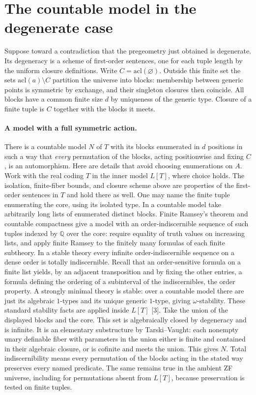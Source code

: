 \documentclass[11pt]{article}
\begin{document}
\section{The countable model in the degenerate case}
Suppose toward a contradiction that the pregeometry just obtained is degenerate. Its degeneracy is a scheme of first-order sentences, one for each tuple length by the uniform closure definitions. Write $C=\mathrm{acl}(\varnothing)$. Outside this finite set the sets $\mathrm{acl}(a)\setminus C$ partition the universe into blocks: membership between generic points is symmetric by exchange, and their singleton closures then coincide. All blocks have a common finite size $d$ by uniqueness of the generic type. Closure of a finite tuple is $C$ together with the blocks it meets.
\paragraph{A model with a full symmetric action.} There is a countable model $N$ of $T$ with its blocks enumerated in $d$ positions in such a way that \emph{every} permutation of the blocks, acting positionwise and fixing $C$, is an automorphism. Here are details that avoid choosing enumerations on $A$. Work with the real coding $T$ in the inner model $L[T]$, where choice holds. The isolation, finite-fiber bounds, and closure scheme above are properties of the first-order sentences in $T$ and hold there as well. One may name the finite tuple enumerating the core, using its isolated type. In a countable model take arbitrarily long lists of enumerated distinct blocks. Finite Ramsey's theorem and countable compactness give a model with an order-indiscernible sequence of such tuples indexed by $\mathbb Q$ over the core: require equality of truth values on increasing lists, and apply finite Ramsey to the finitely many formulas of each finite subtheory. In a stable theory every infinite order-indiscernible sequence on a dense order is totally indiscernible. Recall that an order-sensitive formula on a finite list yields, by an adjacent transposition and by fixing the other entries, a formula defining the ordering of a subinterval of the indiscernibles, the order property. A strongly minimal theory is stable: over a countable model there are just its algebraic $1$-types and its unique generic $1$-type, giving $\omega$-stability. These standard stability facts are applied inside $L[T]$ [3].
Take the union of the displayed blocks and the core. This set is algebraically closed by degeneracy and is infinite. It is an elementary substructure by Tarski--Vaught: each nonempty unary definable fiber with parameters in the union either is finite and contained in their algebraic closure, or is cofinite and meets the union. This gives $N$. Total indiscernibility means every permutation of the blocks acting in the stated way preserves every named predicate. The same remains true in the ambient ZF universe, including for permutations absent from $L[T]$, because preservation is tested on finite tuples.
\end{document}

